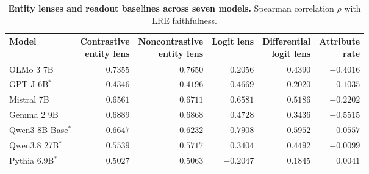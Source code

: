 \begin{table}[t]
\centering
\caption{\textbf{Entity lenses and readout baselines across seven models.} Spearman correlation $\rho$ with LRE faithfulness.}
\label{tab:shared-lenses-spearman}
\begin{tabular}{@{}lrrrrr@{}}
\toprule
Model & \shortstack[r]{Contrastive\\entity lens} & \shortstack[r]{Noncontrastive\\entity lens} & Logit lens & \shortstack[r]{Differential\\logit lens} & \shortstack[r]{Attribute\\rate} \\
\midrule
OLMo 3 7B & $\phantom{-}0.7355$ & $\phantom{-}0.7650$ & $\phantom{-}0.2056$ & $\phantom{-}0.4390$ & $-0.4016$ \\
GPT-J 6B$^{*}$ & $\phantom{-}0.4346$ & $\phantom{-}0.4196$ & $\phantom{-}0.4669$ & $\phantom{-}0.2020$ & $-0.1035$ \\
Mistral 7B & $\phantom{-}0.6561$ & $\phantom{-}0.6711$ & $\phantom{-}0.6581$ & $\phantom{-}0.5186$ & $-0.2202$ \\
Gemma 2 9B & $\phantom{-}0.6889$ & $\phantom{-}0.6868$ & $\phantom{-}0.4728$ & $\phantom{-}0.3436$ & $-0.5515$ \\
Qwen3 8B Base$^{*}$ & $\phantom{-}0.6647$ & $\phantom{-}0.6232$ & $\phantom{-}0.7908$ & $\phantom{-}0.5952$ & $-0.0557$ \\
Qwen3.8 27B$^{*}$ & $\phantom{-}0.5539$ & $\phantom{-}0.5717$ & $\phantom{-}0.3404$ & $\phantom{-}0.4492$ & $-0.0099$ \\
Pythia 6.9B$^{*}$ & $\phantom{-}0.5027$ & $\phantom{-}0.5063$ & $-0.2047$ & $\phantom{-}0.1845$ & $\phantom{-}0.0041$ \\
\bottomrule
\end{tabular}
\end{table}
